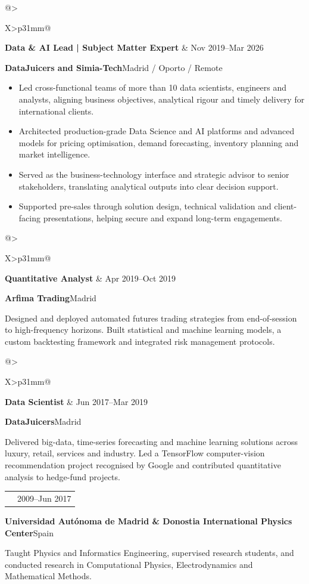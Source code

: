 \documentclass[9pt,a4paper]{extarticle}
\makeatletter
\newcommand{\job}[4]{%
  \par\noindent
  \begin{tabularx}{\linewidth}{@{}>{\raggedright\arraybackslash}X>{\raggedleft\arraybackslash}p{31mm}@{}}
    {\bfseries\color{ink}#1} & {\color{muted}#2} \\
  \end{tabularx}
  {\color{accent}\bfseries #3}\hfill{\color{secondary}#4}\par
  \vspace{0.35mm}
}
\makeatother
\begin{document}
\job{Data \& AI Lead | Subject Matter Expert}{Nov 2019--Mar 2026}{DataJuicers and Simia-Tech}{Madrid / Oporto / Remote}
\begin{itemize}
  \item Led cross-functional teams of more than 10 data scientists, engineers and analysts, aligning business objectives, analytical rigour and timely delivery for international clients.
  \item Architected production-grade Data Science and AI platforms and advanced models for pricing optimisation, demand forecasting, inventory planning and market intelligence.
  \item Served as the business-technology interface and strategic advisor to senior stakeholders, translating analytical outputs into clear decision support.
  \item Supported pre-sales through solution design, technical validation and client-facing presentations, helping secure and expand long-term engagements.
\end{itemize}
\vspace{1.2mm}

\job{Quantitative Analyst}{Apr 2019--Oct 2019}{Arfima Trading}{Madrid}
Designed and deployed automated futures trading strategies from end-of-session to high-frequency horizons. Built statistical and machine learning models, a custom backtesting framework and integrated risk management protocols.
\vspace{1.7mm}

\job{Data Scientist}{Jun 2017--Mar 2019}{DataJuicers}{Madrid}
Delivered big-data, time-series forecasting and machine learning solutions across luxury, retail, services and industry. Led a TensorFlow computer-vision recommendation project recognised by Google and contributed quantitative analysis to hedge-fund projects.
\vspace{1.7mm}

\job{Researcher / Lecturer}{2009--Jun 2017}{Universidad Aut\'onoma de Madrid \& Donostia International Physics Center}{Spain}
Taught Physics and Informatics Engineering, supervised research students, and conducted research in Computational Physics, Electrodynamics and Mathematical Methods.

\newpage
\end{document}
